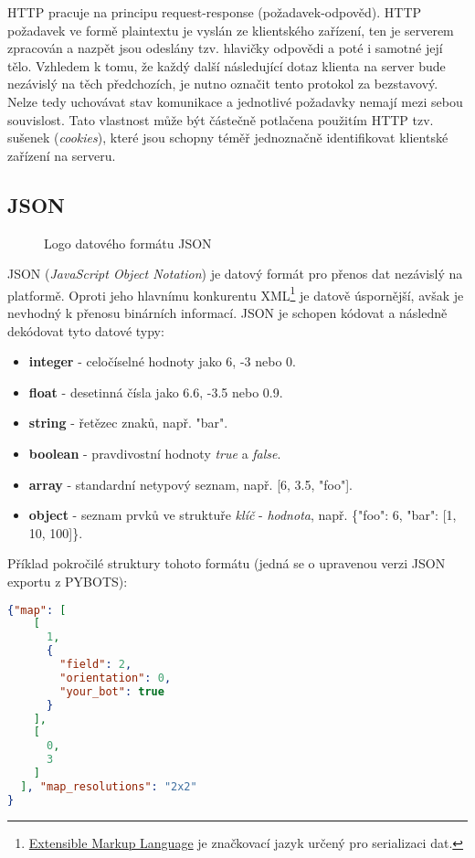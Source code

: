HTTP pracuje na principu request-response (požadavek-odpověd). HTTP požadavek ve formě plaintextu je vyslán ze klientského zařízení, ten je serverem zpracován a nazpět jsou odeslány tzv. hlavičky odpovědi a poté i samotné její tělo. Vzhledem k tomu, že každý další následující dotaz klienta na server bude nezávislý na těch předchozích, je nutno označit tento protokol za bezstavový. Nelze tedy uchovávat stav komunikace a jednotlivé požadavky nemají mezi sebou souvislost. Tato vlastnost může být částečně potlačena použitím HTTP tzv. sušenek (\emph{cookies}), které jsou schopny téměř jednoznačně identifikovat klientské zařízení na serveru.

\subsection{JSON}
\label{subsec:json}

\begin{figure}%
    \centering
    
 	\caption{Logo datového formátu JSON}
\end{figure}

JSON (\emph{JavaScript Object Notation}) je datový formát pro přenos dat nezávislý na platformě. Oproti jeho hlavnímu konkurentu XML\footnote{\href{https://cs.wikipedia.org/wiki/Extensible_Markup_Language}{Extensible Markup Language} je značkovací jazyk určený pro serializaci dat.} je datově úspornější, avšak je nevhodný k přenosu binárních informací. JSON je schopen kódovat a následně dekódovat tyto datové typy:

\begin{itemize}
    \item
    \textbf{integer} - celočíselné hodnoty jako 6, -3 nebo 0.

    \item
    \textbf{float} - desetinná čísla jako 6.6, -3.5 nebo 0.9.

    \item
    \textbf{string} - řetězec znaků, např. "bar".

    \item
    \textbf{boolean} - pravdivostní hodnoty \textit{true} a \textit{false}.

    \item
    \textbf{array} - standardní netypový seznam, např. [6, 3.5, "foo"].

    \item
    \textbf{object} - seznam prvků ve struktuře \textit{klíč} - \textit{hodnota}, např. \{"foo": 6, "bar": [1, 10, 100]\}.
\end{itemize}

Příklad pokročilé struktury tohoto formátu (jedná se o upravenou verzi JSON exportu z PYBOTS):

\begin{lstlisting}[language=json,caption={Ukázka datového formátu JSON}]
 {"map": [
    [
      1,
      {
        "field": 2,
        "orientation": 0,
        "your_bot": true
      }
    ],
    [
      0,
      3
    ]
  ], "map_resolutions": "2x2"
}
\end{lstlisting}
